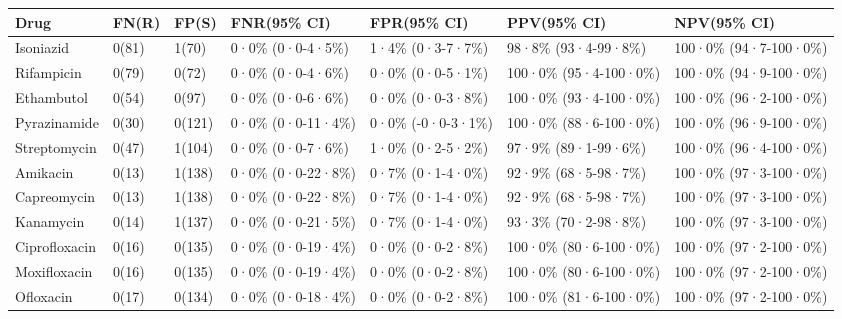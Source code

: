 \begin{tabular}{lllllll}
\toprule
         Drug & FN(R) &  FP(S) &      FNR(95\% CI) &      FPR(95\% CI) &          PPV(95\% CI) &          NPV(95\% CI) \\
\midrule
    Isoniazid & 0(81) &  1(70) &  0·0\% (0·0-4·5\%) &  1·4\% (0·3-7·7\%) &   98·8\% (93·4-99·8\%) & 100·0\% (94·7-100·0\%) \\
   Rifampicin & 0(79) &  0(72) &  0·0\% (0·0-4·6\%) &  0·0\% (0·0-5·1\%) & 100·0\% (95·4-100·0\%) & 100·0\% (94·9-100·0\%) \\
   Ethambutol & 0(54) &  0(97) &  0·0\% (0·0-6·6\%) &  0·0\% (0·0-3·8\%) & 100·0\% (93·4-100·0\%) & 100·0\% (96·2-100·0\%) \\
 Pyrazinamide & 0(30) & 0(121) & 0·0\% (0·0-11·4\%) & 0·0\% (-0·0-3·1\%) & 100·0\% (88·6-100·0\%) & 100·0\% (96·9-100·0\%) \\
 Streptomycin & 0(47) & 1(104) &  0·0\% (0·0-7·6\%) &  1·0\% (0·2-5·2\%) &   97·9\% (89·1-99·6\%) & 100·0\% (96·4-100·0\%) \\
     Amikacin & 0(13) & 1(138) & 0·0\% (0·0-22·8\%) &  0·7\% (0·1-4·0\%) &   92·9\% (68·5-98·7\%) & 100·0\% (97·3-100·0\%) \\
  Capreomycin & 0(13) & 1(138) & 0·0\% (0·0-22·8\%) &  0·7\% (0·1-4·0\%) &   92·9\% (68·5-98·7\%) & 100·0\% (97·3-100·0\%) \\
    Kanamycin & 0(14) & 1(137) & 0·0\% (0·0-21·5\%) &  0·7\% (0·1-4·0\%) &   93·3\% (70·2-98·8\%) & 100·0\% (97·3-100·0\%) \\
Ciprofloxacin & 0(16) & 0(135) & 0·0\% (0·0-19·4\%) &  0·0\% (0·0-2·8\%) & 100·0\% (80·6-100·0\%) & 100·0\% (97·2-100·0\%) \\
 Moxifloxacin & 0(16) & 0(135) & 0·0\% (0·0-19·4\%) &  0·0\% (0·0-2·8\%) & 100·0\% (80·6-100·0\%) & 100·0\% (97·2-100·0\%) \\
    Ofloxacin & 0(17) & 0(134) & 0·0\% (0·0-18·4\%) &  0·0\% (0·0-2·8\%) & 100·0\% (81·6-100·0\%) & 100·0\% (97·2-100·0\%) \\
\bottomrule
\end{tabular}

